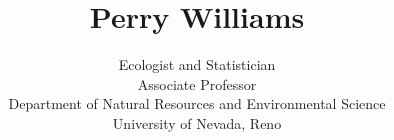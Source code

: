 \title{Perry Williams}
\author{Ecologist and Statistician \\ Associate Professor \\ Department of Natural Resources and Environmental Science \\ University of Nevada, Reno}
\date{}

\maketitle

\begin{center}
\begin{minipage}{0.95\linewidth}
\begin{center}
\end{center}
\end{minipage}
\end{center}

